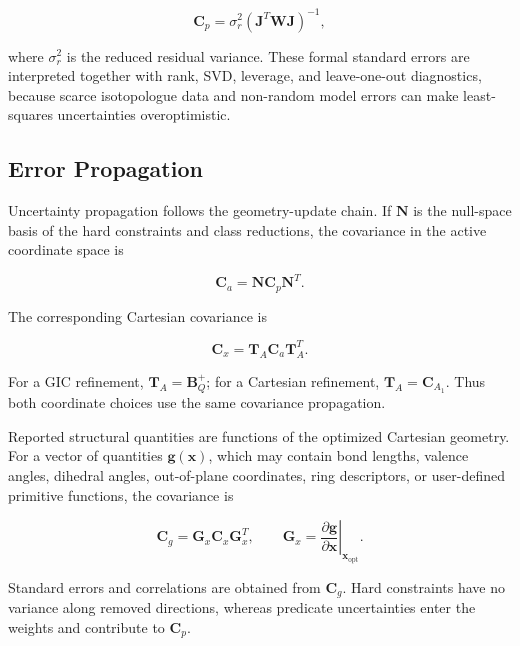 \documentclass[aip,jcp,reprint,longbibliography,floatfix]{revtex4-2}
\begin{document}
\begin{equation}
\mathbf{C}_{p}
=
\sigma_r^2
\left(
\mathbf{J}^{T}
\mathbf{W}
\mathbf{J}
\right)^{-1},
\end{equation}

where $\sigma_r^2$ is the reduced residual variance. These formal standard
errors are interpreted together with rank, SVD, leverage, and leave-one-out
diagnostics, because scarce isotopologue data and non-random model errors can
make least-squares uncertainties overoptimistic.\cite{Demaison2007EquilibriumReview}

\subsection{Error Propagation}

Uncertainty propagation follows the geometry-update chain. If $\mathbf{N}$ is
the null-space basis of the hard
constraints and class reductions, the covariance in the active coordinate
space is

\begin{equation}
\mathbf{C}_{a}
=
\mathbf{N}
\mathbf{C}_{p}
\mathbf{N}^{T}.
\end{equation}

The corresponding Cartesian covariance is

\begin{equation}
\mathbf{C}_{x}
=
\mathbf{T}_{A}
\mathbf{C}_{a}
\mathbf{T}_{A}^{T}.
\end{equation}

For a GIC refinement, $\mathbf{T}_{A}=\mathbf{B}_{Q}^{+}$; for a Cartesian
refinement, $\mathbf{T}_{A}=\mathbf{C}_{A_1}$. Thus both coordinate choices use
the same covariance propagation.

Reported structural quantities are functions of the optimized Cartesian
geometry. For a vector of quantities
$\mathbf{g}(\mathbf{x})$, which may contain bond lengths, valence angles,
dihedral angles, out-of-plane coordinates, ring descriptors, or user-defined
primitive functions, the covariance is

\begin{equation}
\mathbf{C}_{g}
=
\mathbf{G}_{x}
\mathbf{C}_{x}
\mathbf{G}_{x}^{T},
\qquad
\mathbf{G}_{x}
=
\left.
\frac{\partial\mathbf{g}}
{\partial\mathbf{x}}
\right|_{\mathbf{x}_{\mathrm{opt}}}.
\end{equation}

Standard errors and correlations are obtained from $\mathbf{C}_{g}$. Hard
constraints have no variance along removed directions, whereas predicate
uncertainties enter the weights and contribute to $\mathbf{C}_{p}$.
\end{document}
